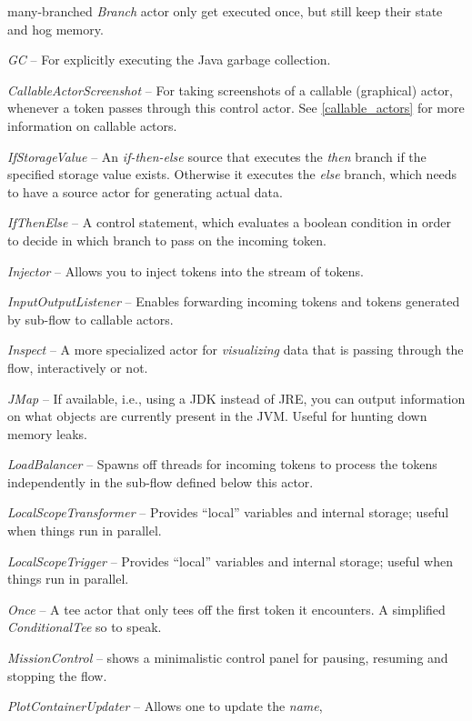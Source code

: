 \begin{tight_itemize}
	many-branched \textit{Branch} actor only get executed once, but still keep
	their state and hog memory.
	\item \textit{GC} -- For explicitly executing the Java garbage collection.
	\item \textit{CallableActorScreenshot} -- For taking screenshots of a callable
	(graphical) actor, whenever a token passes through this control actor.
	See \ref{callable_actors} for more information on callable actors.
	\item \textit{IfStorageValue} -- An \textit{if-then-else} source that executes
	the \textit{then} branch if the specified storage value exists. Otherwise it
	executes the \textit{else} branch, which needs to have a source actor for
	generating actual data.
	\item \textit{IfThenElse} -- A control statement, which evaluates a boolean
	condition in order to decide in which branch to pass on the incoming token.
	\item \textit{Injector} -- Allows you to inject tokens into the stream of
	tokens.
	\item \textit{InputOutputListener} -- Enables forwarding incoming tokens
	and tokens generated by sub-flow to callable actors.
	\item \textit{Inspect} -- A more specialized actor for \textit{visualizing} data
	that is passing through the flow, interactively or not.
	\item \textit{JMap} -- If available, i.e., using a JDK instead of JRE, you can
	output information on what objects are currently present in the JVM. Useful for
	hunting down memory leaks.
	\item \textit{LoadBalancer} -- Spawns off threads for incoming tokens to
	process the tokens independently in the sub-flow defined below this actor.
	\item \textit{LocalScopeTransformer} -- Provides ``local'' variables and internal
	storage; useful when things run in parallel.
	\item \textit{LocalScopeTrigger} -- Provides ``local'' variables and internal
	storage; useful when things run in parallel.
	\item \textit{Once} -- A tee actor that only tees off the first token it
	encounters. A simplified \textit{ConditionalTee} so to speak.
	\item \textit{MissionControl} -- shows a minimalistic control panel
	for pausing, resuming and stopping the flow.
	\item \textit{PlotContainerUpdater} -- Allows one to update the \textit{name},

\end{tight_itemize}
